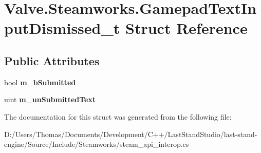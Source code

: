 \hypertarget{structValve_1_1Steamworks_1_1GamepadTextInputDismissed__t}{}\section{Valve.\+Steamworks.\+Gamepad\+Text\+Input\+Dismissed\+\_\+t Struct Reference}
\label{structValve_1_1Steamworks_1_1GamepadTextInputDismissed__t}
\subsection*{Public Attributes}
\begin{DoxyCompactItemize}
\item 
\hypertarget{structValve_1_1Steamworks_1_1GamepadTextInputDismissed__t_adc0274f5ab99a2fa4a83e0d009a5ffba}{}bool {\bfseries m\+\_\+b\+Submitted}\label{structValve_1_1Steamworks_1_1GamepadTextInputDismissed__t_adc0274f5ab99a2fa4a83e0d009a5ffba}

\item 
\hypertarget{structValve_1_1Steamworks_1_1GamepadTextInputDismissed__t_a218aaeb4d295d3ed54e20af1d117799d}{}uint {\bfseries m\+\_\+un\+Submitted\+Text}\label{structValve_1_1Steamworks_1_1GamepadTextInputDismissed__t_a218aaeb4d295d3ed54e20af1d117799d}

\end{DoxyCompactItemize}


The documentation for this struct was generated from the following file\+:\begin{DoxyCompactItemize}
\item 
D\+:/\+Users/\+Thomas/\+Documents/\+Development/\+C++/\+Last\+Stand\+Studio/last-\/stand-\/engine/\+Source/\+Include/\+Steamworks/steam\+\_\+api\+\_\+interop.\+cs\end{DoxyCompactItemize}

